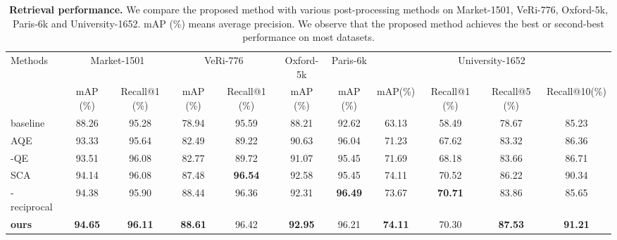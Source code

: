\documentclass[10pt,twocolumn,letterpaper]{article}
\begin{document}
\setlength{\tabcolsep}{5pt}
\begin{table*}[]
\begin{center}
\scriptsize
\begin{tabular}{l|cc|cc|c|c|cccc}
\toprule[1pt]
\multirow{2}{*}{Methods}& 
\multicolumn{2}{c|}{Market-1501}&
\multicolumn{2}{c|}{VeRi-776} &
Oxford-5k&
Paris-6k& 
\multicolumn{4}{c}{University-1652}\\ 
& mAP (\%)  & Recall@1 (\%)   & mAP (\%)  & Recall@1 (\%)  & mAP (\%)& mAP (\%)&
mAP(\%) &Recall@1 (\%)    & Recall@5 (\%)     &Recall@10(\%)
\\ \midrule[0.5pt]
baseline&88.26  &95.28 & 78.94& 95.59& 88.21 & 92.62 &63.13&58.49&78.67&85.23     \\
AQE~\cite{chen2018group}&93.33   &95.64 & 82.49 & 89.22& 90.63 & 96.04 & 71.23& 67.62& 83.32&86.36\\
-QE~\cite{radenovic2018fine}   &93.51  &96.08& 82.77  & 89.72& 91.07 & 95.45& 71.69&68.18&83.66&86.71
\\
SCA~\cite{bai2016sparse}    &94.14  &96.08& 87.48 & \textbf{96.54} & 92.58 & 95.45 &74.11 & 70.52 & 86.22 & 90.34\\
-reciprocal~\cite{zhong2017re}   &94.38  &95.90& 88.44 & 96.36& 92.31 & \textbf{96.49} & 73.67  &\textbf{70.71} & 83.86 & 85.65\\
\textbf{ours}& \textbf{94.65} & \textbf{96.11} & \textbf{88.61}& 96.42& \textbf{92.95}& 96.21 & \textbf{74.11} & 70.30 & \textbf{87.53} & \textbf{91.21}\\
\bottomrule[1pt]
\end{tabular}
\end{center}
\caption{\textbf{Retrieval performance.} We compare the proposed method with various post-processing methods on Market-1501, VeRi-776, Oxford-5k, Paris-6k and University-1652. mAP (\%) means average precision. We observe that the proposed method achieves the best or second-best performance on most datasets.}
\label{table:performance}
\end{table*}
\end{document}
